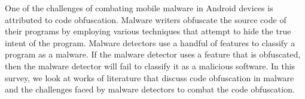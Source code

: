 One of the challenges of combating mobile malware in Android devices is attributed to code obfuscation. Malware writers obfuscate the source code of their programs by employing various techniques that attempt to hide the true intent of the program. Malware detectors use a handful of features to classify a program as a malware. If the malware detector uses a feature that is obfuscated, then the malware detector will fail to classify it as a malicious software. In this survey, we look at works of literature that discuss code obfuscation in malware and the challenges faced by malware detectors to combat the code obfuscation.


